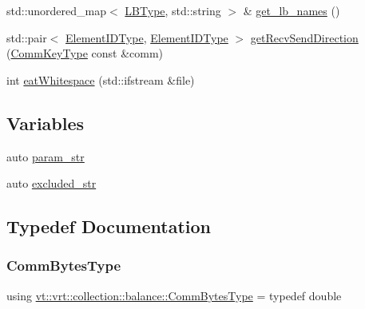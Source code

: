 \begin{DoxyCompactItemize}
\item 
std\+::unordered\+\_\+map$<$ \hyperlink{namespacevt_1_1vrt_1_1collection_1_1balance_ac4f99693509affcc67db182d4aad9b5c}{L\+B\+Type}, std\+::string $>$ \& \hyperlink{namespacevt_1_1vrt_1_1collection_1_1balance_ab24424d5cc677e1c6dfe67d5e03efc70}{get\+\_\+lb\+\_\+names} ()
\item 
std\+::pair$<$ \hyperlink{namespacevt_1_1vrt_1_1collection_1_1balance_a14c8d2c972f2913aa3f1636e5be0a120}{Element\+I\+D\+Type}, \hyperlink{namespacevt_1_1vrt_1_1collection_1_1balance_a14c8d2c972f2913aa3f1636e5be0a120}{Element\+I\+D\+Type} $>$ \hyperlink{namespacevt_1_1vrt_1_1collection_1_1balance_a2d79bdb3acf651303e8a8a0b42d75d78}{get\+Recv\+Send\+Direction} (\hyperlink{namespacevt_1_1vrt_1_1collection_1_1balance_a01c9a1060d83d052604a3ff12918033a}{Comm\+Key\+Type} const \&comm)
\item 
int \hyperlink{namespacevt_1_1vrt_1_1collection_1_1balance_a605ea184edf7f99b0022f960f71bf4d4}{eat\+Whitespace} (std\+::ifstream \&file)
\end{DoxyCompactItemize}
\subsection*{Variables}
\begin{DoxyCompactItemize}
\item 
auto \hyperlink{namespacevt_1_1vrt_1_1collection_1_1balance_aaed7e09146a45c2932ca185a55161723}{param\+\_\+str}
\item 
auto \hyperlink{namespacevt_1_1vrt_1_1collection_1_1balance_af2f6674ecc7191ddbfe31e87569fe334}{excluded\+\_\+str}
\end{DoxyCompactItemize}


\subsection{Typedef Documentation}
\mbox{\label{namespacevt_1_1vrt_1_1collection_1_1balance_a0772d7dd137393e9874b9f8caa96d420}} 
\subsubsection{\texorpdfstring{Comm\+Bytes\+Type}{CommBytesType}}
{\footnotesize\ttfamily using \hyperlink{namespacevt_1_1vrt_1_1collection_1_1balance_a0772d7dd137393e9874b9f8caa96d420}{vt\+::vrt\+::collection\+::balance\+::\+Comm\+Bytes\+Type} = typedef double}

